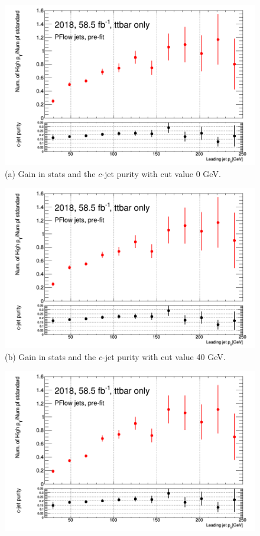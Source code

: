 \documentclass[letterpaper,12pt]{article}
\begin{document}
\begin{figure}
\begin{minipage}[b]{.45\textwidth}
\centering
\includegraphics[width=1\textwidth]{stat_gains/statsgain_0GeV.png}
\footnotesize (a) Gain in stats and the $c$-jet purity with cut value 0 GeV.
\end{minipage}\hfill
\begin{minipage}[b]{.45\textwidth}
\centering
\includegraphics[width=1\textwidth]{stat_gains/statsgain_40GeV.png}
\footnotesize (b) Gain in stats and the $c$-jet purity with cut value 40 GeV.
\end{minipage}\hfill
\begin{minipage}[b]{.45\textwidth}
\centering
\includegraphics[width=1\textwidth]{stat_gains/statsgain_70GeV.png}

\end{minipage}
\end{figure}
\end{document}
